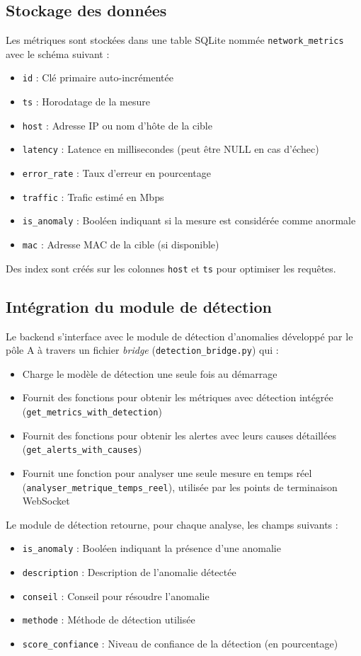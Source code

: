 \documentclass[12pt,a4paper]{report}
\begin{document}
\subsection{Stockage des données}
Les métriques sont stockées dans une table SQLite nommée \texttt{network\_metrics} avec le schéma suivant :
\begin{itemize}
    \item \texttt{id} : Clé primaire auto-incrémentée
    \item \texttt{ts} : Horodatage de la mesure
    \item \texttt{host} : Adresse IP ou nom d'hôte de la cible
    \item \texttt{latency} : Latence en millisecondes (peut être NULL en cas d'échec)
    \item \texttt{error\_rate} : Taux d'erreur en pourcentage
    \item \texttt{traffic} : Trafic estimé en Mbps
    \item \texttt{is\_anomaly} : Booléen indiquant si la mesure est considérée comme anormale
    \item \texttt{mac} : Adresse MAC de la cible (si disponible)
\end{itemize}

Des index sont créés sur les colonnes \texttt{host} et \texttt{ts} pour optimiser les requêtes.

\subsection{Intégration du module de détection}
Le backend s'interface avec le module de détection d'anomalies développé par le pôle A à travers un fichier \textit{bridge} (\texttt{detection\_bridge.py}) qui :
\begin{itemize}
    \item Charge le modèle de détection une seule fois au démarrage
    \item Fournit des fonctions pour obtenir les métriques avec détection intégrée (\texttt{get\_metrics\_with\_detection})
    \item Fournit des fonctions pour obtenir les alertes avec leurs causes détaillées (\texttt{get\_alerts\_with\_causes})
    \item Fournit une fonction pour analyser une seule mesure en temps réel (\texttt{analyser\_metrique\_temps\_reel}), utilisée par les points de terminaison WebSocket
\end{itemize}

Le module de détection retourne, pour chaque analyse, les champs suivants :
\begin{itemize}
    \item \texttt{is\_anomaly} : Booléen indiquant la présence d'une anomalie
    \item \texttt{description} : Description de l'anomalie détectée
    \item \texttt{conseil} : Conseil pour résoudre l'anomalie
    \item \texttt{methode} : Méthode de détection utilisée
    \item \texttt{score\_confiance} : Niveau de confiance de la détection (en pourcentage)
\end{itemize}
\end{document}
